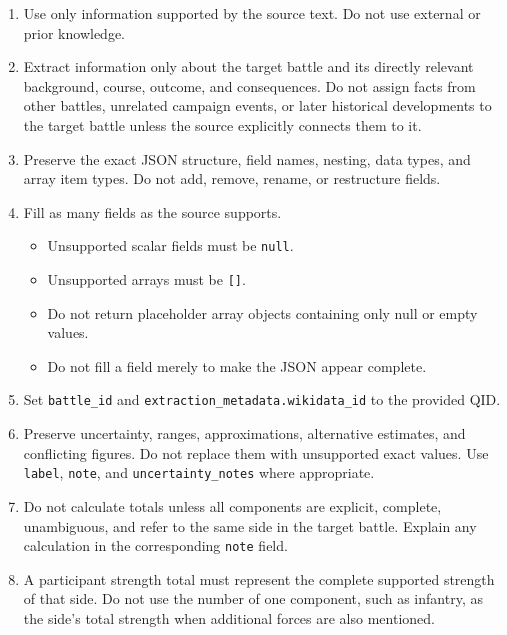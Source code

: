 \begin{enumerate}[
    leftmargin=1.2cm,
    itemsep=5pt,
    topsep=3pt,
    parsep=0pt,
    label=\textbf{\arabic*.}
]

    \item Use only information supported by the source text. Do not use external or prior knowledge.

    \item Extract information only about the target battle and its directly relevant background, course, outcome, and consequences. Do not assign facts from other battles, unrelated campaign events, or later historical developments to the target battle unless the source explicitly connects them to it.

    \item Preserve the exact JSON structure, field names, nesting, data types, and array item types. Do not add, remove, rename, or restructure fields.

    \item Fill as many fields as the source supports.
    \begin{itemize}[
        leftmargin=1.5em,
        itemsep=2pt,
        topsep=3pt,
        parsep=0pt
    ]
        \item Unsupported scalar fields must be \texttt{null}.
        \item Unsupported arrays must be \texttt{[]}.
        \item Do not return placeholder array objects containing only null or empty values.
        \item Do not fill a field merely to make the JSON appear complete.
    \end{itemize}

    \item Set \texttt{battle\_id} and \texttt{extraction\_metadata.wikidata\_id} to the provided QID.

    \item Preserve uncertainty, ranges, approximations, alternative estimates, and conflicting figures. Do not replace them with unsupported exact values. Use \texttt{label}, \texttt{note}, and \texttt{uncertainty\_notes} where appropriate.

    \item Do not calculate totals unless all components are explicit, complete, unambiguous, and refer to the same side in the target battle. Explain any calculation in the corresponding \texttt{note} field.

    \item A participant strength total must represent the complete supported strength of that side. Do not use the number of one component, such as infantry, as the side's total strength when additional forces are also mentioned.


\end{enumerate}
